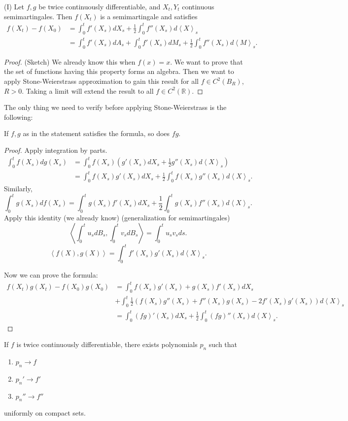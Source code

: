 \begin{theorem}(I)
	Let $f, g$ be twice continuously differentiable, and $X_t, Y_t$ continuous semimartingales. Then $f(X_t)$ is a semimartingale and satisfies
	\begin{align*}
		f(X_t) - f(X_0) 
		&= \int _0^t f'(X_s) d X_s + \frac{1}{2} \int _0^t f''(X_s) d\left\langle X \right\rangle _s\\
		&= \int _0^t f'(X_s) d A_s + \int _0^t f'(X_s) d M_s + \frac{1}{2 }\int _0^t f''(X_s) d \left\langle M \right\rangle _s 
	.\end{align*} 
\end{theorem}
\begin{proof}
	(Sketch)
	We already know this when  $f(x) = x$. We want to prove that the set of functions having this property forms an algebra. Then we want to apply Stone-Weierstrass approximation to gain this result for all $f \in  C^2(B_R)$, $R > 0$. Taking a limit will extend the result to all $f \in C^2(\mathbb{R})$.
\end{proof}

The only thing we need to verify before applying Stone-Weierstrass is the following:
\begin{claim}
	If $f, g$ as in the statement satisfies the formula, so does $f g$.
\end{claim}
\begin{proof}
	Apply integration by parts.
	\begin{align*}
		\int _0^t f(X_s) d g(X_s) 
		&= \int _0^t f(X_s) \left( g'(X_s) d X_s + \frac{1}{2} g''(X_s) d \left\langle X \right\rangle _s \right)  \\
		&= \int _0^t f(X_s) g'(X_s) d X_s + \frac{1}{2} \int _0^t f(X_s) g''(X_s) d \left\langle X \right\rangle _s 
	.\end{align*}
	Similarly,
	\[
		\int _0^t g(X_s) d f(X_s) = \int _0^t g(X_s) f'(X_s) d X_s + \frac{1}{2} \int _0^t g(X_s) f''(X_s) d \left\langle X \right\rangle _s
	.\] 
	Apply this identity (we already know) (generalization for semimartingales)
	\[
		\left\langle \int _0^t u_s d B_s, \int _0^t v_s d B_s \right\rangle = \int _0^t u_s v_s d s
	.\] 
	\[
		\left\langle f(X), g(X) \right\rangle 
		= \int _0^t f'(X_s) g'(X_s) d \left\langle X \right\rangle _s
	.\] 
	
	Now we can prove the formula:
	\begin{align*}
		f(X_t) g(X_t) - f(X_0) g(X_0)
		&= \int _0^t f(X_s) g'(X_s) + g(X_s) f'(X_s) d X_s\\
		&+ \int _0^t \frac{1}{2} \left( f(X_s) g''(X_s) + f''(X_s) g(X_s) - 2 f'(X_s) g'(X_s) \right) d\left\langle X \right\rangle _s \\
		&= \int _0^t (fg)' (X_s) dX_s + \frac{1}{2} \int _0^t (fg)'' (X_s) d \left\langle X \right\rangle _s 
	.\end{align*}
\end{proof}

\begin{fact}
	If $f$ is twice continuously differentiable, there exists polynomials $p_n$ such that
	\begin{enumerate}
		\item $p_n \to f$
		\item $p_n' \to  f'$
		\item $p_n'' \to  f''$
	\end{enumerate}
	uniformly on compact sets.
\end{fact}




